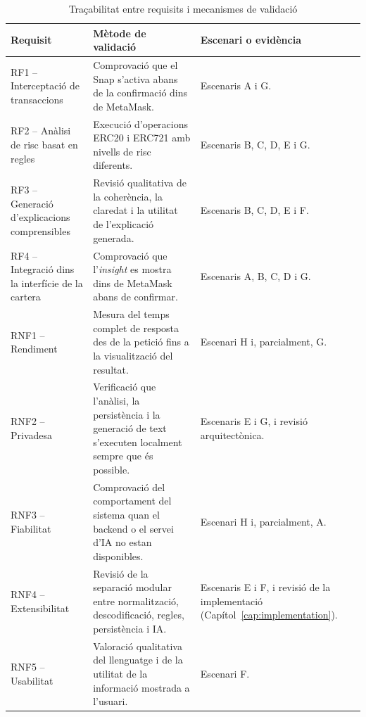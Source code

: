 \begin{table}[htbp]
\centering
\small
\renewcommand{\arraystretch}{1.45}
\setlength{\tabcolsep}{9pt}
\begin{tabularx}{\textwidth}{p{} | X | p{}}
\hline
\textbf{Requisit} & \textbf{Mètode de validació} & \textbf{Escenari o evidència} \\
\hline
RF1 -- Interceptació de transaccions &
Comprovació que el Snap s’activa abans de la confirmació dins de MetaMask. &
Escenaris A i G. \\
\hline
RF2 -- Anàlisi de risc basat en regles &
Execució d’operacions ERC20 i ERC721 amb nivells de risc diferents. &
Escenaris B, C, D, E i G. \\
\hline
RF3 -- Generació d’explicacions comprensibles &
Revisió qualitativa de la coherència, la claredat i la utilitat de l’explicació generada. &
Escenaris B, C, D, E i F. \\
\hline
RF4 -- Integració dins la interfície de la cartera &
Comprovació que l’\textit{insight} es mostra dins de MetaMask abans de confirmar. &
Escenaris A, B, C, D i G. \\
\hline
RNF1 -- Rendiment &
Mesura del temps complet de resposta des de la petició fins a la visualització del resultat. &
Escenari H i, parcialment, G. \\
\hline
RNF2 -- Privadesa &
Verificació que l’anàlisi, la persistència i la generació de text s’executen localment sempre que és possible. &
Escenaris E i G, i revisió arquitectònica. \\
\hline
RNF3 -- Fiabilitat &
Comprovació del comportament del sistema quan el backend o el servei d’IA no estan disponibles. &
Escenari H i, parcialment, A. \\
\hline
RNF4 -- Extensibilitat &
Revisió de la separació modular entre normalització, descodificació, regles, persistència i IA. &
Escenaris E i F, i revisió de la implementació (Capítol~\ref{cap:implementation}). \\
\hline
RNF5 -- Usabilitat &
Valoració qualitativa del llenguatge i de la utilitat de la informació mostrada a l’usuari. &
Escenari F. \\
\hline
\end{tabularx}
\caption{Traçabilitat entre requisits i mecanismes de validació}
\label{tab:tracabilitat_requisits}
\end{table}
